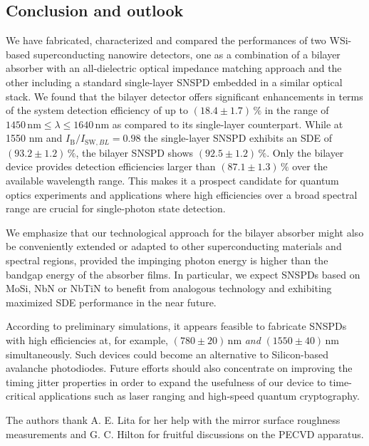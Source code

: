 \documentclass[aip,apl,showpacs,showkeys,preprint,superscriptaddress,preprintnumbers,amsmath,amssymb]{revtex4-1}
\begin{document}
\begin{bibunit}
\section{Conclusion and outlook}

We have fabricated, characterized and compared the performances of two WSi-based superconducting nanowire detectors, one as a combination of a bilayer absorber with an all-dielectric optical impedance matching approach and the other including a standard single-layer SNSPD embedded in a similar optical stack. We found that the bilayer detector offers significant enhancements in terms of the system detection efficiency of up to $\left(18.4\pm1.7\right)\,\%$ in the range of $1450\,\mathrm{nm}\le\lambda\le1640\,\mathrm{nm}$ as compared to its single-layer counterpart. While at 1550 nm and $I_\mathrm{B}/I_{\mathrm{SW},BL}=0.98$ the single-layer SNSPD exhibits an SDE of $\left(93.2\pm1.2\right)\,\%$, the bilayer SNSPD shows $\left(92.5\pm1.2\right)\,\%$. Only the bilayer device provides detection efficiencies larger than $\left(87.1\pm1.3\right)\,\%$ over the available wavelength range. This makes it a prospect candidate for quantum optics experiments and applications where high efficiencies over a broad spectral range are crucial for single-photon state detection.

We emphasize that our technological approach for the bilayer absorber might also be conveniently extended or adapted to other superconducting materials and spectral regions, provided the impinging photon energy is higher than the bandgap energy of the absorber films. In particular, we expect SNSPDs based on MoSi,  NbN\cite{Zhang2016a} or NbTiN \cite{EsmaeilZadeh2016} to benefit from analogous technology and exhibiting maximized SDE performance in the near future. 

According to preliminary simulations, it appears feasible to fabricate SNSPDs with high efficiencies at, for example, $(780\pm20)\,\mathrm{nm}$ \textit{and} $(1550\pm40)\,\mathrm{nm}$ simultaneously. Such devices could become an alternative to Silicon-based avalanche photodiodes. Future efforts should also concentrate on improving the timing jitter properties in order to expand the usefulness of our device to time-critical applications such as laser ranging and high-speed quantum cryptography.


\acknowledgments
The authors thank A. E. Lita for her help with the mirror surface roughness measurements and G. C. Hilton for fruitful discussions on the PECVD apparatus.\\

\putbib
\end{bibunit}
\end{document}
